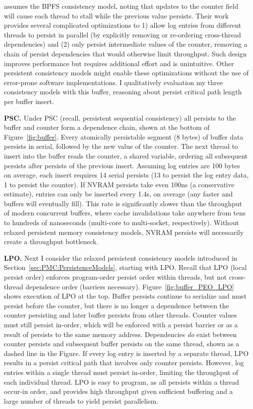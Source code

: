 \cite{FangHsiao11} assumes the BPFS consistency model, noting that updates to the counter field will cause each thread to stall while the previous value persists.
Their work provides several complicated optimizations to 1) allow log entries from different threads to persist in parallel (by explicitly removing or re-ordering cross-thread dependencies) and (2) only persist intermediate values of the counter, removing a chain of persist dependencies that would otherwise limit throughput.
Such design improves performance but requires additional effort and is unintuitive.
Other persistent consistency models might enable these optimizations without the use of error-prone software implementations.
I qualitatively evaluation my three consistency models with this buffer, reasoning about persist critical path length per buffer insert.

\textbf{PSC.} Under PSC (recall, persistent sequential consistency) all persists to the buffer and counter form a dependence chain, shown at the bottom of Figure~\ref{fig:buffer}.
Every atomically persistable segment (8 bytes) of buffer data persists in serial, followed by the new value of the counter.
The next thread to insert into the buffer reads the counter, a shared variable, ordering all subsequent persists after persists of the previous insert.
Assuming log entries are 100 bytes on average, each insert requires 14 serial persists (13 to persist the log entry data, 1 to persist the counter).
If NVRAM persists take even 100ns (a conservative estimate), entries can only be inserted every 1.4\textmu s, on average (any faster and buffers will eventually fill).
This rate is significantly slower than the throughput of modern concurrent buffers, where cache invalidations take anywhere from tens to hundreds of nanoseconds (multi-core to multi-socket, respectively).
Without relaxed persistent memory consistency models, NVRAM persists will necessarily create a throughput bottleneck.



\textbf{LPO.} Next I consider the relaxed persistent consistency models introduced in Section~\ref{sec:PMC:PersistenceModels}, starting with LPO.
Recall that LPO (local persist order) enforces program-order persist order within threads, but not cross-thread dependence order (barriers necessary).
Figure~\ref{fig:buffer_PEO_LPO} shows execution of LPO at the top.
Buffer persists continue to serialize and must persist before the counter, but there is no longer a dependence between the counter persisting and later buffer persists from other threads.
Counter values must still persist in-order, which will be enforced with a persist barrier or as a result of persists to the same memory address.
Dependencies \emph{do} exist between counter persists and subsequent buffer persists on the same thread, shown as a dashed line in the Figure.
If every log entry is inserted by a separate thread, LPO results in a persist critical path that involves only counter persists.
However, log entries within a single thread must persist in-order, limiting the throughput of each individual thread.
LPO is easy to program, as all persists within a thread occur-in order, and provides high throughput given sufficient buffering and a large number of threads to yield persist parallelism.

